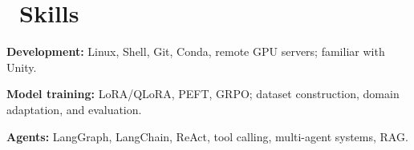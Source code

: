 \documentclass[10pt,a4paper]{article}
\begin{document}
\section{\faCogs\ Skills}
\textbf{Development:} Linux, Shell, Git, Conda, remote GPU servers; familiar with Unity.\par
\textbf{Model training:} LoRA/QLoRA, PEFT, GRPO; dataset construction, domain adaptation, and evaluation.\par
\textbf{Agents:} LangGraph, LangChain, ReAct, tool calling, multi-agent systems, RAG.
\end{document}
